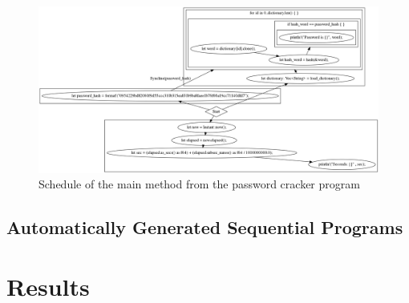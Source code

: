 \begin{figure}[H]
    \centering
    \includegraphics[width=\textwidth]{img/password-cracker/main-schedule.png}
    \caption{Schedule of the main method from the password cracker program}
\end{figure}


\subsection{Automatically Generated Sequential Programs}

\section{Results}
